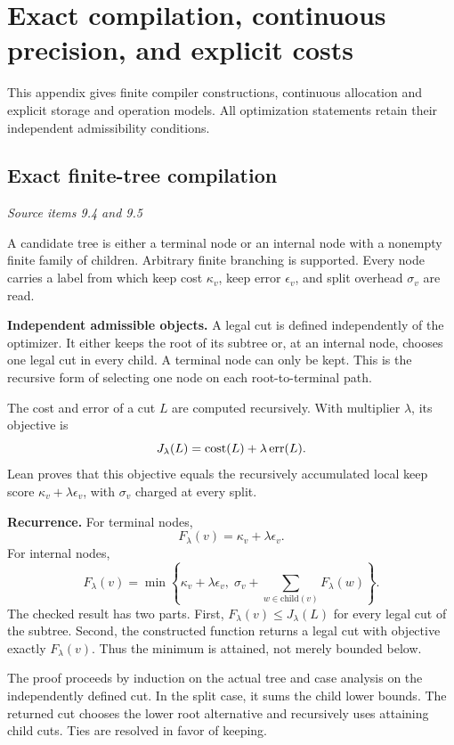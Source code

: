 \clearpage\FloatBarrier\section{Exact compilation, continuous precision, and explicit costs}\label{supp2:section:001}
This appendix gives finite compiler constructions, continuous allocation and explicit storage and operation models. All optimization statements retain their independent admissibility conditions.\par

\subsection{Exact finite-tree compilation}\label{supp2:subsection:001}\textit{Source items 9.4 and 9.5}\par
A candidate tree is either a terminal node or an internal node with a nonempty finite family of children. Arbitrary finite branching is supported. Every node carries a label from which keep cost $\kappa_v$, keep error $\epsilon_v$, and split overhead $\sigma_v$ are read.

\textbf{Independent admissible objects.} A legal cut is defined independently of the optimizer. It either keeps the root of its subtree or, at an internal node, chooses one legal cut in every child. A terminal node can only be kept. This is the recursive form of selecting one node on each root-to-terminal path.

The cost and error of a cut $L$ are computed recursively. With multiplier $\lambda$, its objective is
\[
J_\lambda(L)=\operatorname{cost}(L)+\lambda\operatorname{err}(L).
\]
Lean proves that this objective equals the recursively accumulated local keep score $\kappa_v+\lambda\epsilon_v$, with $\sigma_v$ charged at every split.

\textbf{Recurrence.} For terminal nodes,
\[
F_\lambda(v)=\kappa_v+\lambda\epsilon_v.
\]
For internal nodes,
\[
\boxed{F_\lambda(v)=\min\left\{\kappa_v+\lambda\epsilon_v,
\;\sigma_v+\sum_{w\in\mathrm{child}(v)}F_\lambda(w)\right\}.}
\]
The checked result has two parts. First, $F_\lambda(v)\leq J_\lambda(L)$ for every legal cut of the subtree. Second, the constructed function  returns a legal cut with objective exactly $F_\lambda(v)$. Thus the minimum is attained, not merely bounded below.

The proof proceeds by induction on the actual tree and case analysis on the independently defined cut. In the split case, it sums the child lower bounds. The returned cut chooses the lower root alternative and recursively uses attaining child cuts. Ties are resolved in favor of keeping.


